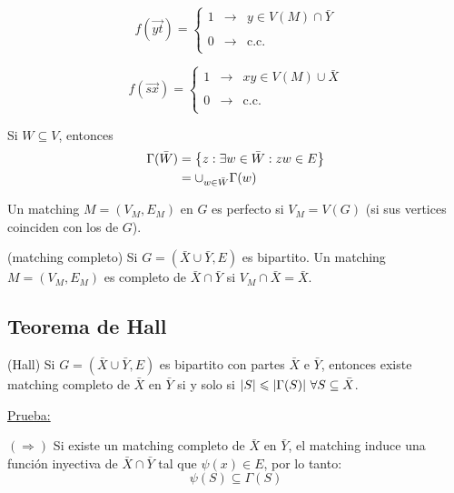 \documentclass[12pt,a4paper]{article}
\begin{document}
$$f(\overrightarrow{yt})= \left\{ \begin{array}{lcc}
    1 & \to & y \in V(M) \cap \bar{Y}\\
    \\ 0& \to & \text{c.c.}\\
    \end{array}
    \right.$$

$$f(\overrightarrow{sx})= \left\{ \begin{array}{lcc}
    1 & \to & xy \in V(M) \cup \bar{X}\\
    \\ 0& \to & \text{c.c.}\\
    \end{array}
    \right.$$

\begin{definition} Si $W \subseteq V$, entonces
    \begin{align*}
        \Gamma(\bar{W}) &= \left\lbrace z: \exists w \in \bar{W}: zw\in E \right\rbrace\\
        &= \cup_{w\in \bar{W}} \Gamma(w)\\
    \end{align*}
\end{definition}

\begin{definition} Un matching $M=(V_{M}, E_{M})$ en $G$ es perfecto si $V_{M} = V(G)$ 
    (si sus vertices coinciden con los de $G$).
\end{definition}

\begin{definition} (matching completo) Si $G = (\bar{X} \cup \bar{Y}, E)$ es bipartito. 
    Un matching $M = (V_{M}, E_{M})$ es completo de $\bar{X} \cap \bar{Y}$ si $V_{M} \cap \bar{X} = \bar{X}$.
\end{definition}

\subsection{Teorema de Hall}
\begin{teorema} (Hall) Si $G = (\bar{X} \cup \bar{Y}, E)$ es bipartito con partes 
    $\bar{X}$ e $\bar{Y}$, entonces existe matching completo de $\bar{X}$ en $\bar{Y}$
    si y solo si $|S| \leqslant |\Gamma(S)| \,\, \forall S \subseteq \bar{X}$.
\end{teorema}

\underline{Prueba:}
\medskip

$(\Rightarrow)$ Si existe un matching completo de $\bar{X}$ en $\bar{Y}$, el matching 
induce una función inyectiva de $\bar{X} \cap \bar{Y}$ tal que $\psi(x) \in E$, por lo tanto:
$$\psi(S) \subseteq \Gamma(S)$$
\end{document}
